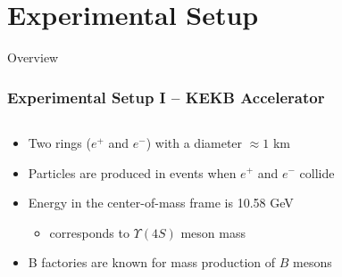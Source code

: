 \documentclass[serif]{beamer}
\begin{document}
\section{Experimental Setup} 

\begin{frame}[t]{Overview}
\end{frame}


\begin{frame}[t]
\frametitle{Experimental Setup I -- KEKB Accelerator}
\vspace{-3mm}
\small

\begin{columns}
	\begin{block}{}
		\begin{itemize}
			\item Two rings ($e^+$ and $e^-$) with a diameter $ \approx 1$ km
			\item Particles are produced in events when $e^+$ and $e^-$ collide
			\item Energy in the center-of-mass frame is 10.58 GeV
			\begin{itemize}
				\item corresponds to $\Upsilon(4S)$ meson mass
			\end{itemize}
			\item B factories are known for mass production of $B$ mesons
		\end{itemize}
	\end{block}
	

\end{columns}
\end{frame}
\end{document}
